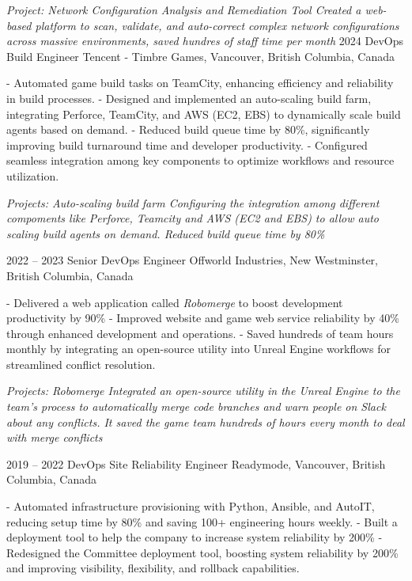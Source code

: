 \documentclass[9pt]{developercv} %
\begin{document}
\begin{entrylist}
{            \textit{Project: Network Configuration Analysis and Remediation Tool\newline
            Created a web-based platform to scan, validate, and auto-correct complex network configurations across massive environments, saved hundres of staff time per month}
        }
	\entry
		{2024}
		{DevOps Build Engineer}
		{Tencent - Timbre Games, Vancouver, British Columbia, Canada}
		{
            - Automated game build tasks on TeamCity, enhancing efficiency and reliability in build processes. \newline
            - Designed and implemented an auto-scaling build farm, integrating Perforce, TeamCity, and AWS (EC2, EBS) to dynamically scale build agents based on demand.\newline
            - Reduced build queue time by 80\%, significantly improving build turnaround time and developer productivity.\newline
            - Configured seamless integration among key components to optimize workflows and resource utilization.\newline

            \textit{Projects: Auto-scaling build farm\newline
            Configuring the integration among different compoments like Perforce, Teamcity and AWS (EC2 and EBS) to allow 
            auto scaling build agents on demand. Reduced build queue time by 80\%\newline}
        }
	\entry
		{2022 -- 2023}
		{Senior DevOps Engineer}
		{Offworld Industries, New Westminster, British Columbia, Canada}
		{
            - Delivered a web application called \textit{Robomerge} to boost development productivity by 90\%\newline
            - Improved website and game web service reliability by 40\% through enhanced development and operations.\newline
            - Saved hundreds of team hours monthly by integrating an open-source utility into Unreal Engine workflows for streamlined conflict resolution.\newline

            \textit{Projects: Robomerge\newline
            Integrated an open-source utility in the Unreal Engine to the team’s process to automatically merge code branches and warn people on Slack about any conflicts. It saved the game team hundreds of hours every month to deal with merge conflicts\newline}
        }
    \entry
		{2019 -- 2022}
		{DevOps Site Reliability Engineer}
		{Readymode, Vancouver, British Columbia, Canada}
		{
            - Automated infrastructure provisioning with Python, Ansible, and AutoIT, reducing setup time by 80\% and saving 100+ engineering hours weekly.\newline
            - Built a deployment tool to help the company to increase system reliability by 200\%\newline
            - Redesigned the Committee deployment tool, boosting system reliability by 200\% and improving visibility, flexibility, and rollback capabilities.\newline

}
\end{entrylist}
\end{document}
